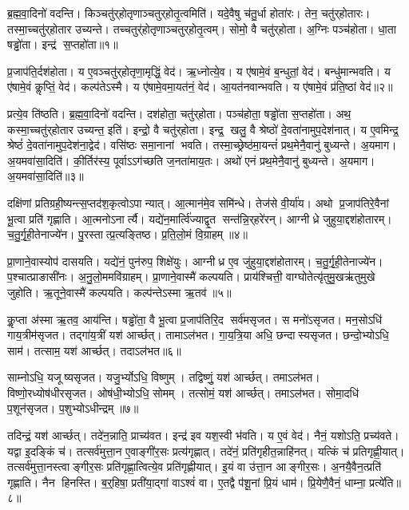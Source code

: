 ब्र॒ह्म॒वा॒दिनो॑ वदन्ति।
किञ्चतु॑र्‌होतृणाञ्चतुर्‌होतृ॒त्वमिति॑।
यदे॒वैषु च॑तु॒र्धा होता॑रः।
तेन॒ चतु॑र्‌होतारः।
तस्मा॒च्चतु॑र्‌होतार उच्यन्ते।
तच्चतुर्॑होतृणाञ्चतुर्‌होतृ॒त्वम्।
सोमो॒ वै चतु॑र्‌होता।
अ॒ग्निः पञ्च॑होता।
धा॒ता षड्ढो॑ता।
इन्द्र॑ स॒प्तहो॑ता॥१॥

प्र॒जाप॑ति॒र्दश॑होता।
य ए॒वञ्चतु॑र्‌होतृणा॒मृद्धिं॒ वेद॑।
ऋ॒ध्नोत्ये॒व।
य ए॑षामे॒वं ब॒न्धुतां॒ वेद॑।
बन्धु॑मान्भवति।
य ए॑षामे॒वं कॢप्तिं॒ वेद॑।
कल्प॑तेऽस्मै।
य ए॑षामे॒वमा॒यत॑नं॒ वेद॑।
आ॒यत॑नवान्भवति।
य ए॑षामे॒वं प्र॑ति॒ष्ठां वेद॑॥२॥

प्रत्ये॒व ति॑ष्ठति।
ब्र॒ह्म॒वा॒दिनो॑ वदन्ति।
दश॑होता॒ चतु॑र्‌होता।
पञ्च॑होता॒ षड्ढो॑ता स॒प्तहो॑ता।
अथ॒ कस्मा॒च्चतु॑र्‌होतार उच्यन्त॒ इति॑।
इन्द्रो॒ वै चतु॑र्‌होता।
इन्द्र॒ खलु॒ वै श्रेष्ठो॑ दे॒वता॑नामुप॒देश॑नात्।
य ए॒वमिन्द्र॒ श्रेष्ठं॑ दे॒वता॑नामुप॒देश॑ना॒द्वेद॑।
वसि॑ष्ठः समा॒नानां भवति।
तस्मा॒च्छ्रेष्ठ॑मा॒यन्तं॑ प्रथ॒मेनै॒वानु॑ बुध्यन्ते।
अ॒यमाग\sn{}।
अ॒यमवा॑सा॒दिति॑।
की॒र्तिर॑स्य॒ पूर्वाऽऽग॑च्छति ज॒नता॑माय॒तः।
अथो॑ एनं प्रथ॒मेनै॒वानु॑ बुध्यन्ते।
अ॒यमाग\sn{}।
अ॒यमवा॑सा॒दिति॑॥३॥\anuvakamend[स॒प्तहो॑ता प्रति॒ष्ठां वेद॑ बुध्यन्ते॒ षट्च॑]

दक्षि॑णां प्रतिग्रही॒ष्यन्त्स॒प्तद॑श॒कृत्वोऽपान्यात्।
आ॒त्मान॑मे॒व समि॑न्धे।
तेज॑से वी॒र्या॑य।
अथो प्र॒जाप॑तिरे॒वैनां भू॒त्वा प्रति॑ गृह्णाति।
आ॒त्मनोऽनार्त्यै।
यद्ये॑न॒मार्त्वि॑ज्याद्वृ॒त सन्त॑न्नि॒र्‌हरे॑रन्।
आग्नीध्रे जुहुया॒द्दश॑होतारम्।
च॒तु॒र्गृ॒ही॒तेनाज्ये॑न।
पु॒रस्तात्प्र॒त्यङ्तिष्ठ\sn{}।
प्र॒ति॒लो॒मं वि॒ग्राहम्॥४॥

प्रा॒णाने॒वास्योप॑ दासयति।
यद्ये॑नं॒ पुन॑रुप॒ शिक्षे॑युः।
आग्नीध्र ए॒व जु॑हुया॒द्दश॑होतारम्।
च॒तु॒र्गृ॒ही॒तेनाज्ये॑न।
प॒श्चात्प्राङासी॑नः।
अ॒नु॒लो॒ममवि॑ग्राहम्।
प्रा॒णाने॒वास्मै॑ कल्पयति।
प्राय॑श्चित्ती॒ वाग्घोतेत्यृ॑तुमु॒खऋ॑तुमुखे जुहोति।
ऋ॒तूने॒वास्मै॑ कल्पयति।
कल्प॑न्तेऽस्मा ऋ॒तव॑॥५॥

कॢ॒प्ता अ॑स्मा ऋ॒तव॒ आय॑न्ति।
षड्ढो॑ता॒ वै भू॒त्वा प्र॒जाप॑तिरि॒द सर्व॑मसृजत।
स मनो॑ऽसृजत।
मन॒सोऽधि॑ गाय॒त्रीम॑सृजत।
तद्गा॑य॒त्रीं यश॑ आर्च्छत्।
तामाऽल॑भत।
गा॒य॒त्रि॒या अधि॒ छन्दास्यसृजत।
छन्दो॒भ्योऽधि॒ साम॑।
तत्साम॒ यश॑ आर्च्छत्।
तदाऽल॑भत॥६॥

साम्नोऽधि॒ यजूष्यसृजत।
यजु॒र्भ्योऽधि॒ विष्णुम्।
तद्विष्णुं॒ यश॑ आर्च्छत्।
तमाऽल॑भत।
विष्णो॒रध्योष॑धीरसृजत।
ओष॑धी॒भ्योऽधि॒ सोमम्।
तत्सोमं॒ यश॑ आर्च्छत्।
तमाऽल॑भत।
सोमा॒दधि॑ प॒शून॑सृजत।
प॒शुभ्योऽधीन्द्रम्॥७॥

तदिन्द्रं॒ यश॑ आर्च्छत्।
तदे॑न॒न्नाति॒ प्राच्य॑वत।
इन्द्र॑ इव यश॒स्वी भ॑वति।
य ए॒वं वेद॑।
नैनं॒ यशोऽति॒ प्रच्य॑वते।
यद्वा इ॒दङ्किं च॑।
तत्सर्व॑मुत्ता॒न ए॒वाङ्गी॑र॒सः प्रत्य॑गृह्णात्।
तदे॑नं॒ प्रति॑गृहीत॒न्नाहि॑नत्।
यत्किं च॑ प्रतिगृह्णी॒यात्।
तत्सर्व॑मुत्ता॒नस्त्वाङ्गीर॒सः प्रति॑गृह्णा॒त्वित्ये॒व प्रति॑गृह्णीयात्।
इ॒यं वा उ॑त्ता॒न आङ्गीर॒सः।
अ॒नयै॒वैन॒त्प्रति॑ गृह्णाति।
नैन हिनस्ति।
ब॒र्॒हिषा॒ प्रती॑या॒द्गां वाऽश्वं॑ वा।
ए॒तद्वै प॑शू॒नां प्रि॒यं धाम॑।
प्रि॒येणै॒वैनं॒ धाम्ना॒ प्रत्ये॑ति॥८॥\anuvakamend[वि॒ग्राह॑मृ॒तव॒स्तदाऽल॑भ॒तेन्द्रं॑ गृह्णीया॒थ्षट्च॑]

